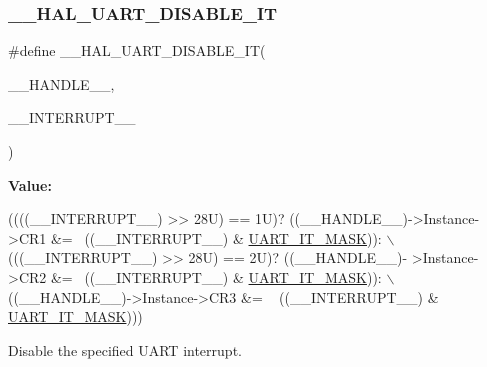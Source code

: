 \subsubsection{\texorpdfstring{\+\_\+\+\_\+\+H\+A\+L\+\_\+\+U\+A\+R\+T\+\_\+\+D\+I\+S\+A\+B\+L\+E\+\_\+\+IT}{\_\_HAL\_UART\_DISABLE\_IT}}
{\footnotesize\ttfamily \#define \+\_\+\+\_\+\+H\+A\+L\+\_\+\+U\+A\+R\+T\+\_\+\+D\+I\+S\+A\+B\+L\+E\+\_\+\+IT(\begin{DoxyParamCaption}\item[{}]{\+\_\+\+\_\+\+H\+A\+N\+D\+L\+E\+\_\+\+\_\+,  }\item[{}]{\+\_\+\+\_\+\+I\+N\+T\+E\+R\+R\+U\+P\+T\+\_\+\+\_\+ }\end{DoxyParamCaption})}

{\bfseries Value\+:}
\begin{DoxyCode}
((((\_\_INTERRUPT\_\_) >> 28U) == 1U)? ((\_\_HANDLE\_\_)->Instance->CR1 &= ~((\_\_INTERRUPT\_\_) & 
      \mbox{\hyperlink{group___u_a_r_t___exported___macros_ga869439269c26e8dee93d49b1c7e67448}{UART\_IT\_MASK}})): \(\backslash\)
                                                           (((\_\_INTERRUPT\_\_) >> 28U) == 2U)? ((\_\_HANDLE\_\_)-
      >Instance->CR2 &= ~((\_\_INTERRUPT\_\_) & \mbox{\hyperlink{group___u_a_r_t___exported___macros_ga869439269c26e8dee93d49b1c7e67448}{UART\_IT\_MASK}})): \(\backslash\)
                                                        ((\_\_HANDLE\_\_)->Instance->CR3 &= ~ ((\_\_INTERRUPT\_\_) 
      & \mbox{\hyperlink{group___u_a_r_t___exported___macros_ga869439269c26e8dee93d49b1c7e67448}{UART\_IT\_MASK}})))
\end{DoxyCode}


Disable the specified U\+A\+RT interrupt. 


